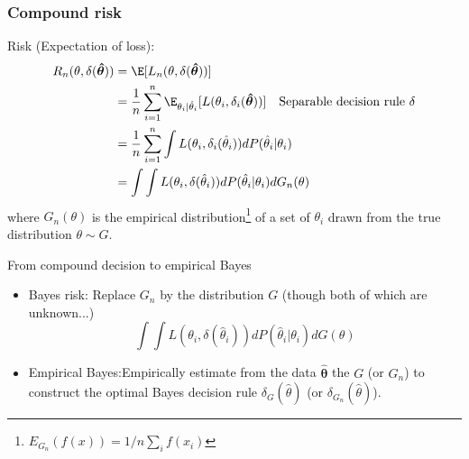 \documentclass[10pt, aspectratio=169]{beamer}
\begin{document}
\begin{frame}
  \frametitle{Compound risk}
  Risk (Expectation of loss):
  \begin{align*}
    R_n(\theta, \delta(\boldsymbol{\hat{\theta}})) & = \E[L_n(\theta, \delta(\boldsymbol{\hat{\theta}}))]                                                                                                          \\
                                                   & = \frac{1}{n}\sum_{i=1}^n \E_{\theta_i|\hat{\theta}_i}[L(\theta_i, \delta_i(\boldsymbol{\hat{\theta}}))]         \quad \text{Separable decision rule } \delta \\
                                                   & = \frac{1}{n}\sum_{i=1}^n \int L(\theta_i, \delta_i(\hat{\theta}_i))dP(\hat{\theta}_i|\theta_i)                                                               \\
                                                   & = \int \int L(\theta_i, \delta(\hat{\theta}_i))dP(\hat{\theta}_i|\theta_i)dG_n(\theta)
  \end{align*}
  where $G_n(\theta)$ is the empirical distribution\footnote{$E_{G_n}(f(x)) = 1/n \sum_i f(x_i)$} of a set of $\theta_i$ drawn from the true distribution $\theta \sim G$.
\end{frame}
\begin{frame}{From compound decision to empirical Bayes}
  \begin{itemize}
    \item \alert{Bayes risk}:
          Replace $G_n$ by the distribution $G$ (though both of which are unknown...)
          \begin{equation*}
            \int \int L(\theta_i, \delta(\hat{\theta}_i))dP(\hat{\theta}_i|\theta_i)dG(\theta)
          \end{equation*}
    \item \alert{Empirical Bayes}:Empirically estimate from the data $\boldsymbol{\hat{\theta}}$ the $G$ (or $G_n$) to construct the optimal Bayes decision rule $\delta_G(\hat{\theta})$ (or $\delta_{G_n}(\hat{\theta})$).
  \end{itemize}
\end{frame}
\end{document}
